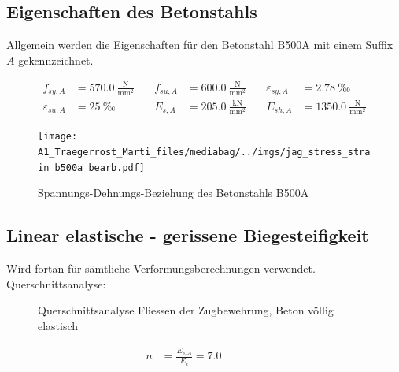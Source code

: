 \documentclass[
  11pt,
  letterpaper,
]{scrreprt}
\begin{document}
\subsection{Eigenschaften des
Betonstahls}\label{eigenschaften-des-betonstahls}

Allgemein werden die Eigenschaften für den Betonstahl B500A mit einem
Suffix \(A\) gekennzeichnet.

\[
\begin{aligned}
f_{sy , A}& = 570.0 \ \frac{\mathrm{N}}{\mathrm{mm}^{2}} \quad & f_{su , A}& = 600.0 \ \frac{\mathrm{N}}{\mathrm{mm}^{2}} \quad & \varepsilon_{sy , A}& = 2.78 \ \mathrm{‰} \\ 
\varepsilon_{su , A}& = 25 \ \mathrm{‰} \quad & E_{s , A}& = 205.0 \ \frac{\mathrm{kN}}{\mathrm{mm}^{2}} \quad & E_{sh , A}& = 1350.0 \ \frac{\mathrm{N}}{\mathrm{mm}^{2}} \end{aligned}
\]

\begin{figure}[H]

{\centering \texttt{[image: A1\_Traegerrost\_Marti\_files/mediabag/../imgs/jag\_stress\_strain\_b500a\_bearb.pdf]}

}

\caption{Spannungs-Dehnungs-Beziehung des Betonstahls B500A}

\end{figure}%

\subsection{Linear elastische - gerissene
Biegesteifigkeit}\label{linear-elastische---gerissene-biegesteifigkeit}

Wird fortan für sämtliche Verformungsberechnungen verwendet.
Querschnittsanalyse:

\begin{figure}[H]


\caption{\label{fig-jag_gerissene_steifigkeit}Querschnittsanalyse
Fliessen der Zugbewehrung, Beton völlig elastisch}

\end{figure}%

\[
\begin{aligned}
n& = \frac{E_{s , A}}{E_{c}} = 7.0 \  \quad &  \quad &  
 \end{aligned}
\]
\end{document}
